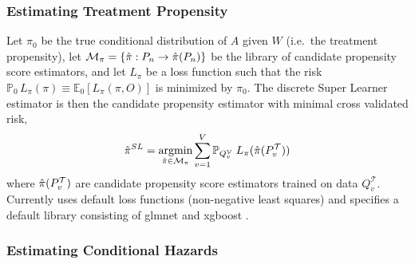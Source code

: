\hypertarget{sec-trt-ps}{%
\subsubsection{Estimating Treatment Propensity}\label{sec-trt-ps}}

Let \({\pi}_0\) be the true conditional distribution of \(A\) given \({{W}}\) (i.e.~the treatment propensity), let \(\mathcal{M}_{{\pi}} = \left\{\Hat{{\pi}} : P_n \to \Hat{{\pi}}(P_n)\right\}\) be the library of candidate propensity score estimators, and let \(L_{\pi}\) be a loss function such that the risk \(\mathbb{P}_0\,L_{\pi}({\pi}) \equiv \mathbb{E}_0\left[L_{\pi}({\pi}, O)\right]\) is minimized by \({\pi}_0\). The discrete Super Learner estimator is then the candidate propensity estimator with minimal cross validated risk, \begin{equation}
\Hat{{\pi}}^{SL} = \mathop{\mathrm{argmin}}_{\Hat{{\pi}} \in \mathcal{M}_{\pi}} \sum_{v = 1}^{V} \mathbb{P}_{Q^\mathcal{V}_v} \; L_{\pi}(\Hat{{\pi}}(P^\mathcal{T}_v)) \label{propsl}
\end{equation} where \(\Hat{{\pi}}(P^\mathcal{T}_v)\) are candidate propensity score estimators trained on data \(Q^\mathcal{T}_v\). Currently  uses default  loss functions (non-negative least squares) and specifies a default library consisting of glmnet \citep{friedman_regularization_2010} and xgboost \citep{chen_xgboost_2016}.

\hypertarget{sec-haz}{%
\subsubsection{Estimating Conditional Hazards}\label{sec-haz}}

